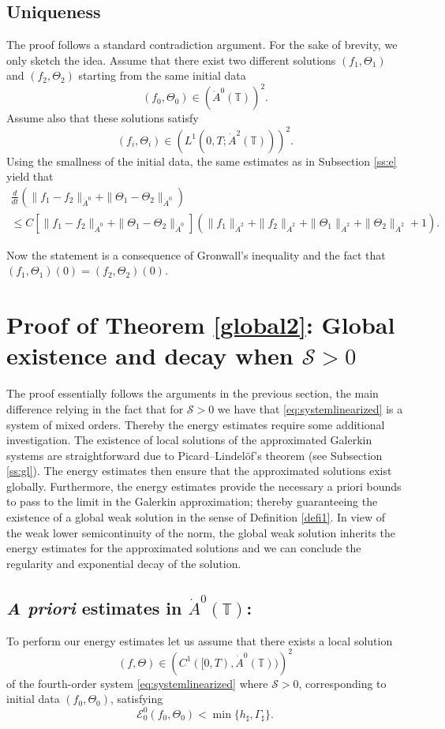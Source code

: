 \documentclass[reqno,11pt]{amsart}
\newcommand{\TT}{{\mathbb T}}
\newcommand{\bh}{h_\sharp}
\newcommand{\bG}{\Gamma_\sharp}
\begin{document}
{\subsection{Uniqueness}
\label{ss:unique}
The proof follows a standard contradiction argument. For the sake of brevity, we only sketch the idea. Assume that there exist two different solutions $(f_1,\Theta_1)$ and $(f_2,\Theta_2)$ starting from the same initial data 
$$
(f_0,\Theta_0)\in \left(\dot A^0(\TT)\right)^2.
$$ 
Assume also that these solutions satisfy 
$$
(f_i,\Theta_i)\in \left( L^{1}(0,T;\dot A^2(\TT))\right)^2.
$$ Using the smallness of the initial data, the same estimates as in Subsection \ref{ss:e} yield that
\begin{multline*}
\frac{d}{dt}\left(\|f_1-f_2\|_{\dot A^0}+\|\Theta_1-\Theta_2\|_{\dot A^0}\right)\\
\leq C\left[\|f_1-f_2\|_{\dot A^0}+\|\Theta_1-\Theta_2\|_{\dot A^0}\right]\left(\|f_1\|_{\dot A^2}+\|f_2\|_{\dot A^2}+\|\Theta_1\|_{\dot A^2}+\|\Theta_2\|_{\dot A^2}+1\right).
\end{multline*} 

Now the statement is a consequence of Gronwall's  inequality and the fact that $(f_1,\Theta_1)(0)=(f_2,\Theta_2)(0)$.


\section{Proof of Theorem \ref{global2}: Global existence and decay when $\mathcal{S}>0$}
\label{S:T2}
The proof essentially follows the arguments in the previous section, the main difference relying in the fact that for $\mathcal S>0$ we have that \eqref{eq:systemlinearized}  is a system of mixed orders. Thereby the energy estimates require some additional investigation. The existence of local solutions of the approximated Galerkin systems are straightforward due to Picard--Lindel\"of's theorem (see Subsection \ref{ss:gl}). The energy estimates then ensure that the approximated solutions exist globally. Furthermore, the energy estimates provide the necessary a priori bounds to pass to the limit in the Galerkin approximation; thereby guaranteeing the existence of a global weak solution in the sense of Definition \ref{defi1}. In view of the weak lower semicontinuity of the norm, the global weak solution inherits the energy estimates for the approximated solutions and we can conclude the regularity and exponential decay of the solution.

\subsection{\emph{A priori} estimates in $\dot A^0(\TT)$:} 
To perform our energy estimates let us assume that there exists a local solution 
$$
(f,\Theta)\in \left(C^1([0,T), \dot A^0(\TT)) \right)^2
$$ 
of the fourth-order system \eqref{eq:systemlinearized} where $\mathcal{S}>0$, corresponding to initial data $(f_0,\Theta_0)$, satisfying 
\[
	\mathscr{E}_0^0(f_0,\Theta_0)<\min\{\bh,\bG\}.
\]

}
\end{document}
